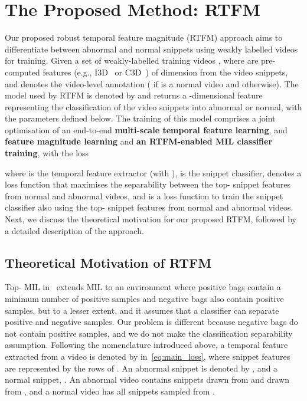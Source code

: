 \documentclass[final]{cvpr}
\begin{document}
\section{The Proposed Method: RTFM}
\label{sec:architecture_overview}



Our proposed robust temporal feature magnitude (RTFM) approach aims to differentiate between abnormal and normal snippets using weakly labelled videos for training. Given a set of weakly-labelled training videos , where  
are pre-computed features (e.g., I3D~\cite{carreira2017quo} or C3D~\cite{tran2015learning}) of dimension  from the  video snippets, and  denotes the video-level annotation ( if  is a normal video and  otherwise).
The model used by RTFM is denoted by  and returns a -dimensional feature  representing the classification of the  video snippets into abnormal or normal, with the parameters  defined below.
The training of this model comprises a joint optimisation of an end-to-end \textbf{multi-scale temporal feature learning}, and 
\textbf{feature magnitude learning} and \textbf{an RTFM-enabled MIL classifier training}, with the loss

where 
 is the temporal feature extractor (with ), 
is the snippet classifier, 
 denotes a loss function 
that maximises the separability between the top- snippet features from normal and abnormal videos, and  is a loss function to train the snippet classifier  also using the top- snippet features from normal and abnormal videos. 
Next, we discuss the theoretical motivation for our proposed RTFM, followed by a detailed description of the approach. 







\subsection{Theoretical Motivation of RTFM}
\label{sec:theory_RTFM}



Top- MIL in~\cite{li2015multiple} extends MIL to an environment where positive bags contain a minimum number of positive samples and negative bags also contain positive samples, but to a lesser extent, and it assumes that a classifier can separate positive and negative samples.
Our problem is different because negative bags do not contain positive samples, and we do not make the classification separability assumption.
Following the nomenclature introduced above, a temporal feature extracted from a video is denoted by  in~\eqref{eq:main_loss}, where snippet features are represented by the rows  of .
An abnormal snippet is denoted by , and a normal snippet, .
An abnormal video  contains  snippets drawn from  and  drawn from , and a normal video  has all  snippets sampled from . 
\end{document}

